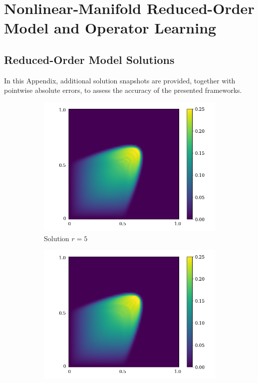 \chapter{Nonlinear-Manifold Reduced-Order Model and Operator Learning}
\section{Reduced-Order Model Solutions}
In this Appendix, additional solution snapshots are provided, together with pointwise absolute errors, to assess the accuracy of the presented frameworks.
\begin{figure}[ht!]
     \begin{center}
        \begin{subfigure}[b]{0.20\textwidth}
            \begin{center}
                \includegraphics[trim = {0, 0, 3cm, 0}, clip, width=\textwidth]{Pictures/X-rom-LE-DAE-5.png}
            \end{center}
            \caption{Solution $r = 5$}
        \end{subfigure}
   \begin{subfigure}[b]{0.20\textwidth}
            \begin{center}
                \includegraphics[trim = {0, 0, 3cm, 0}, clip, width=\textwidth]{Pictures/X-rom-LE-DAE-10.png}

\end{center}
\end{subfigure}
\end{center}
\end{figure}
